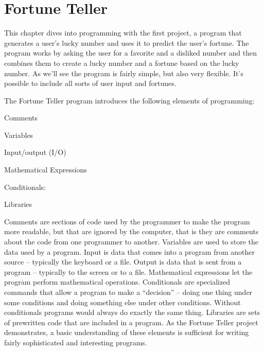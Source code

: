 
\chapter{Fortune Teller}\label{ch:fortune}


This chapter dives into programming with the first project, a program that generates a user's lucky number and uses it to predict the user's fortune.  The program works by asking the user for a favorite and a disliked number and then combines them to create a lucky number and a fortune based on the lucky number.  As we'll see the program is fairly simple, but also very flexible. It's possible to include all sorts of user input and fortunes.

The Fortune Teller program introduces the following elements of programming:
\begin{tight_itemize}
   \item Comments
   \item Variables
   \item Input/output (I/O)
   \item Mathematical Expressions
   \item Conditionals: 
   \item Libraries
\end{tight_itemize}

Comments are sections of code used by the programmer to make the program more readable, but that are ignored by the computer, that is they are comments about the code from one programmer to another.   Variables are used to store the data used by a program.  Input is data that comes into a program from another source -- typically the keyboard or a file.  Output is data that is sent from a program -- typically to the screen or to a file.  Mathematical expressions let the program perform mathematical operations.
Conditionals are specialized commands that allow a program to make a ``decision'' -- doing one thing under some conditions and doing something else under other conditions.  Without conditionals programs would always do exactly the same thing.   
Libraries are sets of prewritten code that are included in a program.  As the Fortune Teller project demonstrates, a basic understanding of these elements is sufficient for writing  fairly sophisticated and interesting programs.

